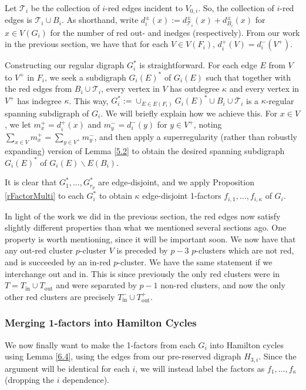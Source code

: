 \documentclass[10pt,letterpaper, reqno]{amsart}
\theoremstyle{definition}
\numberwithin{equation}{section}
\begin{document}
Let $\mathcal{T}_i$ be the collection of $i$-red edges incident to $V_{0,i}$. So, the collection of $i$-red edges is $\mathcal{T}_i \cup B_i$. As shorthand, write $d_i^\pm(x) := d^\pm_{\mathcal{T}_i}(x) + d^\pm_{B_i}(x)$ for $x \in V(G_i)$ for the number of red out- and inedges (respectively). From our work in the previous section, we have that for each $V \in V(F_i)$, $d^+_i(V)=d^-_i(V^+)$.

Constructing our regular digraph $G_i^*$ is straightforward. For each edge $E$ from $V$ to $V^+$ in $F_i$, we seek a subdigraph $G_i(E)^*$ of $G_i(E)$ such that together with the red edges from $B_i \cup \mathcal{T}_i$, every vertex in $V$ has outdegree $\kappa$ and every vertex in $V^+$ has indegree $\kappa$. This way, $G_i^*:= \cup_{E \in E(F_i)} G_i(E)^* \cup B_i \cup \mathcal{T}_i$ is a $\kappa$-regular spanning subdigraph of $G_i$. We will briefly explain how we achieve this. For $x \in V$, we let $m_x^+=d_i^+(x)$ and $m_y^-=d_i^-(y)$ for $y \in V^+$, noting $\sum_{x \in V}m_x^+ = \sum_{y \in V^+}m_y^-$, and then apply a superregularity (rather than robustly expanding) version of Lemma \ref{5.2} to obtain the desired spanning subdigraph $G_i(E)^*$ of $G_i(E) \backslash E(B_i)$. 

It is clear that $G_1^*, \dots, G_{r_p}^*$ are edge-disjoint, and we apply Proposition \ref{rFactorMulti} to each $G_i^*$ to obtain $\kappa$ edge-disjoint 1-factors $f_{i,1}, \dots, f_{i, \kappa}$ of $G_i$.

In light of the work we did in the previous section, the red edges now satisfy slightly different properties than what we mentioned several sections ago. One property is worth mentioning, since it will be important soon. We now have that any out-red cluster $p$-cluster $V$ is preceded by $p-3$ $p$-clusters which are not red, and is succeeded by an in-red $p$-cluster. We have the same statement if we interchange out and in. This is since previously the only red clusters were in $T=T_\text{in} \cup T_\text{out}$ and were separated by $p-1$ non-red clusters, and now the only other red clusters are precisely $T_\text{in}^- \cup T_\text{out}^+$. 

\subsubsection{Merging 1-factors into Hamilton Cycles}
We now finally want to make the 1-factors from each $G_i$ into Hamilton cycles using Lemma \ref{6.4}, using the edges from our pre-reserved digraph $H_{3,i}$. Since the argument will be identical for each $i$, we will instead label the factors as $f_1, \dots, f_\kappa$ (dropping the $i$ dependence).
\end{document}
